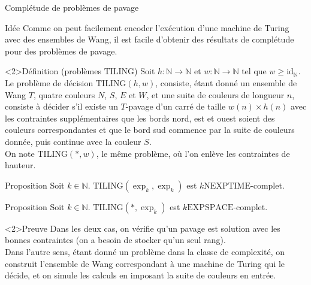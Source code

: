 \documentclass{beamer}
\renewcommand{\ge}{\geqslant}
\newcommand{\N}{\mathbb N}
\newcommand{\id}{\mathrm{id}}
\begin{document}
    \begin{frame}{Complétude de problèmes de pavage}
        
    \begin{block}{Idée}
        Comme on peut facilement encoder l'exécution d'une machine de Turing avec des ensembles de Wang, il est facile d'obtenir des résultats de complétude pour des problèmes de pavage. 
    \end{block}
    
    \begin{alertblock}<2>{Définition (problèmes $\mathrm{TILING}$)}
        Soit $h:\N\to\N$ et $w:\N\to\N$ tel que $w\ge\id_\N$. Le problème de décision $\mathrm{TILING}(h,w)$, consiste, étant donné un ensemble de Wang $T$, quatre couleurs $N$, $S$, $E$ et $W$, et une suite de couleurs de longueur $n$, consiste à décider s'il existe un $T$-pavage d'un carré de taille $w(n)\times h(n)$ avec les contraintes supplémentaires que les bords nord, est et ouest soient des couleurs correspondantes et que le bord sud commence par la suite de couleurs donnée, puis continue avec la couleur $S$.\\
        On note $\mathrm{TILING}(*,w)$, le même problème, où l'on enlève les contraintes de hauteur.
    \end{alertblock}
    
    \end{frame}
    
    \begin{frame}
    
    \begin{block}{Proposition}
        Soit $k\in\N$. $\mathrm{TILING}(\exp_k,\exp_k)$ est $k\mathrm{NEXPTIME}$-complet.
      \end{block}
    
    \begin{block}{Proposition}
        Soit $k\in\N$. $\mathrm{TILING}(*,\exp_k)$ est $k\mathrm{EXPSPACE}$-complet.
    \end{block}
    
    \begin{exampleblock}<2>{Preuve}
        Dans les deux cas, on vérifie qu'un pavage est solution avec les bonnes contraintes (on a besoin de stocker qu'un seul rang).\\
        Dans l'autre sens, étant donné un problème dans la classe de complexité, on construit l'ensemble de Wang correspondant à une machine de Turing qui le décide, et on simule les calculs en imposant la suite de couleurs en entrée.
    \end{exampleblock}
    
    \end{frame}
    
\end{document}
